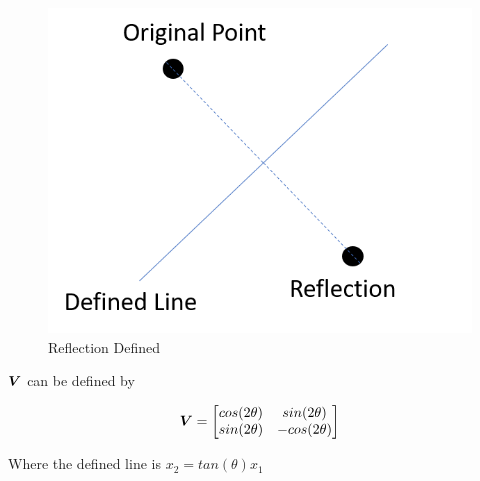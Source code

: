 \begin{figure}[h!]
\begin{center}
\includegraphics{students/SP19_DL_Lab_1_Notes/images/reflection_example.png}
\end{center} 
\caption{Reflection Defined}
\label{fig:mon}
\end{figure}
\FloatBarrier


\(\bm{V}\) can be defined by

\[
\bm{V} = 
\begin{bmatrix}
    cos(2\theta) & sin(2\theta)\\
    sin(2\theta) & -cos(2\theta)
\end{bmatrix}
\]

Where the defined line is \(x_2 = tan(\theta) x_1 \)

